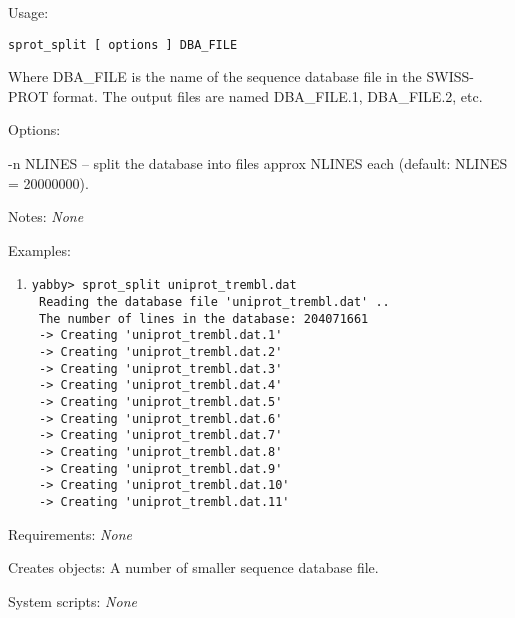 \begin{description}


\item{Usage:}

{\tt sprot\_split [ options ] DBA\_FILE}

 Where DBA\_FILE is the name of the sequence database file in
 the SWISS-PROT format. The output files are named DBA\_FILE.1,
 DBA\_FILE.2, etc.


\item{Options:}
\begin{description}
\item -n NLINES -- split the database into files approx NLINES
 each (default: NLINES = 20000000).
\end{description}


\item{Notes:} {\em None}


\item{Examples:}
\begin{enumerate}

\item
\begin{verbatim}
yabby> sprot_split uniprot_trembl.dat
 Reading the database file 'uniprot_trembl.dat' ..
 The number of lines in the database: 204071661
 -> Creating 'uniprot_trembl.dat.1'
 -> Creating 'uniprot_trembl.dat.2'
 -> Creating 'uniprot_trembl.dat.3'
 -> Creating 'uniprot_trembl.dat.4'
 -> Creating 'uniprot_trembl.dat.5'
 -> Creating 'uniprot_trembl.dat.6'
 -> Creating 'uniprot_trembl.dat.7'
 -> Creating 'uniprot_trembl.dat.8'
 -> Creating 'uniprot_trembl.dat.9'
 -> Creating 'uniprot_trembl.dat.10'
 -> Creating 'uniprot_trembl.dat.11'

\end{verbatim}

\end{enumerate}


\item{Requirements:} {\em None}


\item{Creates objects:} A number of smaller sequence database file.


\item{System scripts:} {\em None}

\end{description}



